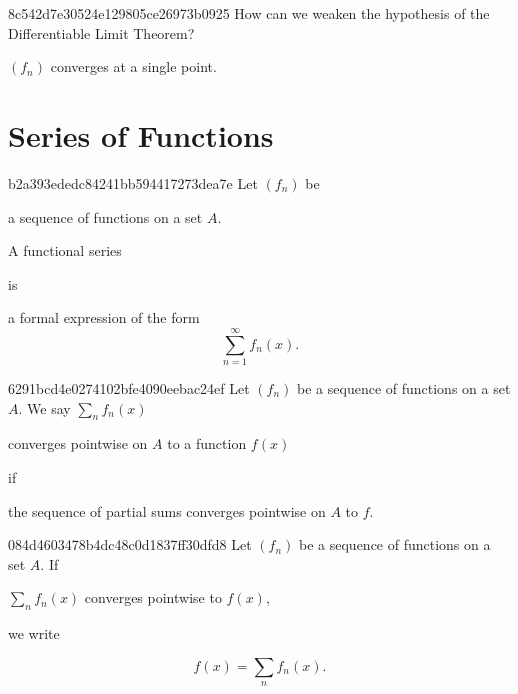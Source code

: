 \begin{note}{8c542d7e30524e129805ce26973b0925}
    How can we weaken the hypothesis of the Differentiable Limit Theorem?

    \begin{cloze}{1}
        \({ (f_n) }\) converges at a single point.
    \end{cloze}
\end{note}

\section{Series of Functions} %
\begin{note}{b2a393ededc84241bb594417273dea7e}
    Let \({ (f_n) }\) be \begin{icloze}{3}a sequence of functions on a set \({ A }\).\end{icloze}
    \begin{icloze}{2}A functional series\end{icloze} is
    \begin{icloze}{1}
        a formal expression of the form
        \[
            \sum_{n=1}^{\infty} f_n(x).
        \]
    \end{icloze}
\end{note}

\begin{note}{6291bcd4e0274102bfe4090eebac24ef}
    Let \({ (f_n) }\) be a sequence of functions on a set \({ A }\).
    We say \({ \sum_n f_n(x) }\) \begin{icloze}{2}converges pointwise on \({ A }\) to a function \({ f(x) }\)\end{icloze} if \begin{icloze}{1}the sequence of partial sums converges pointwise on \({ A }\) to \({ f }\).\end{icloze}
\end{note}

\begin{note}{084d4603478b4dc48c0d1837ff30dfd8}
    Let \({ (f_n) }\) be a sequence of functions on a set \({ A }\).
    If \begin{icloze}{2}\({ \sum_n f_n(x) }\) converges pointwise to \({ f(x) }\),\end{icloze} we write
    \begin{icloze}{1}
        \[
            f(x) = \sum_n f_n(x).
        \]
    \end{icloze}
\end{note}

